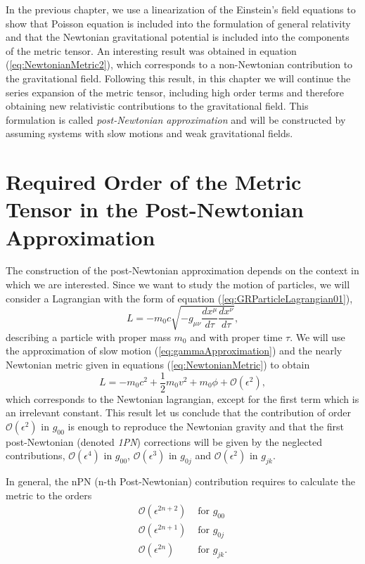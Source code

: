 In the previous chapter, we use a linearization of the Einstein's field equations to show that Poisson equation is included into the formulation of general relativity and that the Newtonian gravitational potential is included into the components of the metric tensor. An interesting result was obtained in equation (\ref{eq:NewtonianMetric2}), which corresponds to a non-Newtonian contribution to the gravitational field. Following this result, in this chapter we will continue the series expansion of the metric tensor, including high order terms and therefore obtaining new relativistic contributions to the gravitational field. This formulation is called \textit{post-Newtonian approximation} and will be constructed by assuming systems with slow motions and weak gravitational fields.

\section{Required Order of the Metric Tensor in the Post-Newtonian Approximation}

The construction of the post-Newtonian approximation depends on the context in which we are interested. Since we want to study the motion of particles, we will consider a Lagrangian with the form of equation (\ref{eq:GRParticleLagrangian01}),
\begin{equation}
L= - m_0 c \sqrt{-g_{\mu \nu} \frac{dx^\mu}{d\tau}\frac{dx^\nu}{d\tau}},
\end{equation}
describing a particle with proper mass $m_0$ and with proper time $\tau$. We will use the approximation of slow motion (\ref{eq:gammaApproximation}) and the nearly Newtonian metric given in equations (\ref{eq:NewtonianMetric})  to obtain 
\begin{equation}
L = -m_0c^2 + \frac{1}{2} m_0v^2 + m_0\phi + \mathcal{O} ( \epsilon^2 ),
\end{equation}
which corresponds to the Newtonian lagrangian, except for the first term which is an irrelevant constant. This result let us conclude that the contribution of order $\mathcal{O}(\epsilon^2)$ in $g_{00}$ is enough to reproduce the Newtonian gravity and that the first post-Newtonian (denoted \textit{1PN}) corrections will be given by the neglected contributions, $\mathcal{O} ( \epsilon^4 )$ in $g_{00}$, $\mathcal{O} ( \epsilon^{3} )$ in $g_{0j}$ and  $\mathcal{O}(\epsilon^2)$ in $g_{jk}$.  

In general, the nPN (n-th Post-Newtonian) contribution requires to calculate the metric to the orders
\begin{subequations}
\begin{align}
\mathcal{O} \left( \epsilon^{2n+2}\right)  &\text{ for } g_{00} \\
\mathcal{O} \left( \epsilon^{2n+1}\right)  &\text{ for } g_{0j} \\
\mathcal{O} \left( \epsilon^{2n}\right)  &\text{ for } g_{jk} .
\end{align} 
\end{subequations}


